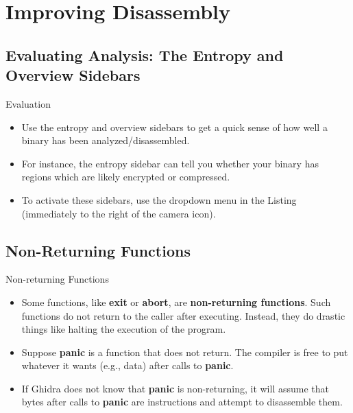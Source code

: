 \documentclass{beamer}
\begin{document}
\section{Improving Disassembly}

\subsection{Evaluating Analysis: The Entropy and Overview Sidebars}

\begin{frame}
\begin{block}{Evaluation} 
\begin{itemize}
\item Use the entropy and overview sidebars to get a quick sense of how well a binary has been analyzed/disassembled. 
\item For instance, the entropy sidebar can tell you whether your binary has regions which are likely encrypted or compressed.
\item To activate these sidebars, use the dropdown menu in the Listing (immediately to the right of the camera icon).
\end{itemize}
\end{block}
\end{frame}

\subsection{Non-Returning Functions}
\begin{frame}
\begin{block}{Non-returning Functions}
\begin{itemize}
\item Some functions, like \textbf{exit} or \textbf{abort}, are \textbf{non-returning functions}.  Such functions do not return to the caller after executing. Instead, they
do drastic things like halting the execution of the program. 
\item Suppose \textbf{panic} is a function that does not return. The compiler is free to put whatever it wants (e.g., data) after calls to \textbf{panic}.
\item If Ghidra does not know that \textbf{panic} is non-returning, it will assume that bytes after calls to \textbf{panic} are instructions and attempt to disassemble them.
\end{itemize}
\end{block}
\end{frame}
\end{document}
